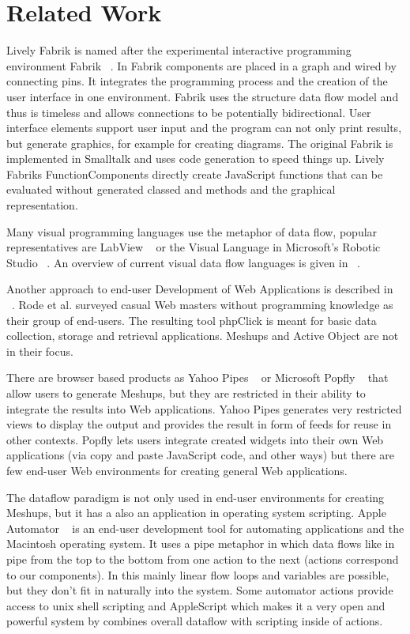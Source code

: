 \documentclass[pdftex, times, 10pt, twocolumn]{article}
\begin{document}
\section{Related Work}
Lively Fabrik is named after the experimental interactive programming environment Fabrik ~\cite{Ingalls1988FVP,Ludolph1988FPE}. In Fabrik components are placed in a graph and wired by connecting pins. It integrates the programming process and the creation of the user interface in one environment. Fabrik uses the structure data flow model and thus is timeless and allows connections to be potentially bidirectional. User interface elements support user input and the program can not only print results, but generate graphics, for example for creating diagrams. The original Fabrik is implemented in Smalltalk and uses code generation to speed things up. Lively Fabriks FunctionComponents directly create JavaScript functions that can be evaluated without generated classed and methods and the graphical representation.  

Many visual programming languages use the metaphor of data flow, popular representatives are LabView ~\cite{Bitter2006LAP} or the Visual Language in Microsoft's Robotic Studio ~\cite{Morgan2008PMR}. An overview of current visual data flow languages is given in ~\cite{Johnston2004ADP}. 

Another approach to end-user Development of Web Applications is described in ~\cite{Rode2006EUD}. Rode et al. surveyed casual Web masters without programming knowledge as their group of end-users. The resulting tool phpClick is meant for basic data collection, storage and retrieval applications. Meshups and Active Object are not in their focus. 

There are browser based products as Yahoo Pipes ~\cite{YahooPipes} or Microsoft Popfly ~\cite{MicrosoftPopfly} that allow users to generate Meshups, but they are restricted in their ability to integrate the results into Web applications. Yahoo Pipes generates very restricted views to display the output and provides the result in form of feeds for reuse in other contexts. Popfly lets users integrate created widgets into their own Web applications (via copy and paste JavaScript code, and other ways) but there are few end-user Web environments for creating general Web applications. 

The dataflow paradigm is not only used in end-user environments for creating Meshups, but it has a also an application in operating system scripting. Apple Automator ~\cite{AppleAutomator} is an end-user development tool for automating applications and the Macintosh operating system. It uses a pipe metaphor in which data flows like in pipe from the top to the bottom from one action to the next (actions correspond to our components). In this mainly linear flow loops and variables are possible, but they don't fit in naturally into the system. Some automator actions provide access to unix shell scripting and AppleScript which makes it a very open and powerful system by combines overall dataflow with scripting inside of actions. 
\end{document}
